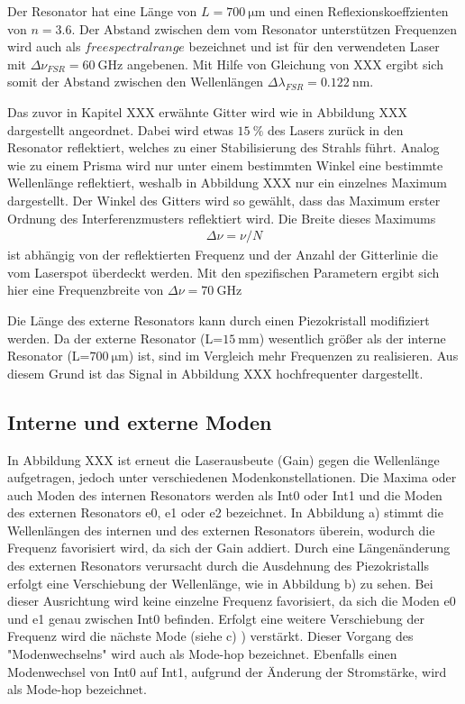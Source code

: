 Der Resonator hat eine Länge von $L=\SI{700}{\micro\meter}$ und einen Reflexionskoeffzienten von $n=3.6$. Der Abstand zwischen dem vom Resonator unterstützen Frequenzen wird auch als $free spectral range$ bezeichnet und ist für den verwendeten Laser mit $\Delta\nu_{FSR}=\SI{60}{\giga\hertz}$ angebenen. Mit Hilfe von Gleichung von XXX ergibt sich somit der Abstand zwischen den Wellenlängen $\Delta\lambda_{FSR}=\SI{0.122}{\nano\meter}$.

Das zuvor in Kapitel XXX erwähnte Gitter wird wie in Abbildung XXX dargestellt angeordnet. Dabei wird etwas $\SI{15}{\percent}$ des Lasers zurück in den Resonator reflektiert, welches zu einer Stabilisierung des Strahls führt. Analog wie zu einem Prisma wird nur unter einem bestimmten Winkel eine bestimmte Wellenlänge reflektiert, weshalb in Abbildung XXX nur ein einzelnes Maximum dargestellt. Der Winkel des Gitters wird so gewählt, dass das Maximum erster Ordnung des Interferenzmusters reflektiert wird. Die Breite dieses Maximums
\begin{align}
	\Delta \nu= \nu/N
\end{align}
ist abhängig von der reflektierten Frequenz und der Anzahl der Gitterlinie die vom Laserspot überdeckt werden. Mit den spezifischen Parametern ergibt sich hier eine Frequenzbreite von $\Delta \nu = \SI{70}{\giga\hertz}$

Die Länge des externe Resonators kann durch einen Piezokristall modifiziert werden. Da der externe Resonator (L=$\SI{15}{\milli\meter}$) wesentlich größer als der interne Resonator (L=$\SI{700}{\micro\meter}$) ist, sind im Vergleich mehr Frequenzen zu realisieren. Aus diesem Grund ist das Signal in Abbildung XXX hochfrequenter dargestellt. 

\subsection{Interne und externe Moden} 
In Abbildung XXX ist erneut die Laserausbeute (Gain) gegen die Wellenlänge aufgetragen, jedoch unter verschiedenen Modenkonstellationen. Die Maxima oder auch Moden des internen Resonators werden als Int0 oder Int1 und die Moden des externen Resonators e0, e1 oder e2 bezeichnet. In Abbildung a) stimmt die Wellenlängen des internen und des externen Resonators überein, wodurch die Frequenz favorisiert wird, da sich der Gain addiert. Durch eine Längenänderung des externen Resonators verursacht durch die Ausdehnung des Piezokristalls erfolgt eine Verschiebung der Wellenlänge, wie in Abbildung b) zu sehen. Bei dieser Ausrichtung wird keine einzelne Frequenz favorisiert, da sich die Moden e0 und e1 genau zwischen Int0 befinden. Erfolgt eine weitere Verschiebung der Frequenz wird die nächste Mode (siehe c) ) verstärkt. Dieser Vorgang des "Modenwechselns" wird auch als Mode-hop bezeichnet. Ebenfalls einen Modenwechsel von Int0 auf Int1, aufgrund der Änderung der Stromstärke, wird als Mode-hop bezeichnet.

